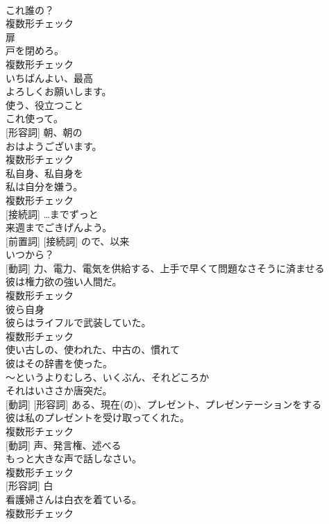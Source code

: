 \documentclass[8pt]{extreport}
\begin{document}
\begin{CJK}{UTF8}{min}
\\	これ誰の？	
\\	複数形チェック
\\	[名詞]	扉	
\\	戸を閉めろ。	
\\	複数形チェック
\\	[形容詞]	いちばんよい、最高	
\\	よろしくお願いします。	
\\	[動詞]	使う、役立つこと	
\\	これ使って。	
\\	[名詞] [形容詞]	朝、朝の	
\\	おはようございます。	
\\	複数形チェック
\\	[代名詞]	私自身、私自身を	
\\	私は自分を嫌う。	
\\	複数形チェック
\\	[前置詞] [接続詞]	…までずっと	
\\	来週までごきげんよう。	
\\	[副詞] [前置詞] [接続詞]	ので、以来	
\\	いつから？	
\\	[名詞] [動詞]	力、電力、電気を供給する、上手で早くて問題なさそうに済ませる	
\\	彼は権力欲の強い人間だ。	
\\	複数形チェック
\\	[代名詞]	彼ら自身	
\\	彼らはライフルで武装していた。	
\\	複数形チェック
\\	[形容詞]	使い古しの、使われた、中古の、慣れて	
\\	彼はその辞書を使った。	
\\	[副詞]	〜というよりむしろ、いくぶん、それどころか	
\\	それはいささか唐突だ。	
\\	[名詞] [動詞] [形容詞]	ある、現在(の)、プレゼント、プレゼンテーションをする	
\\	彼は私のプレゼントを受け取ってくれた。	
\\	複数形チェック
\\	[名詞] [動詞]	声、発言権、述べる	
\\	もっと大きな声で話しなさい。	
\\	複数形チェック
\\	[名詞] [形容詞]	白	
\\	看護婦さんは白衣を着ている。	
\\	複数形チェック

\end{CJK}
\end{document}
